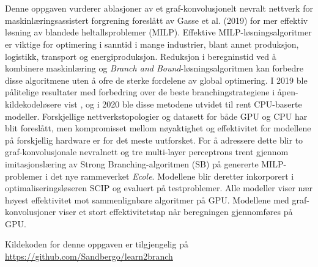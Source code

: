 \chapter*{\norwegianabstractname}
%
Denne oppgaven vurderer ablasjoner av et graf-konvolusjonelt nevralt nettverk for maskinlæringsassistert forgrening foreslått av Gasse et al. (2019) for mer effektiv løsning av blandede heltallsproblemer (\gls{MILP}).
Effektive \gls{MILP}-løsningsalgoritmer er viktige for optimering i sanntid i mange industrier, blant annet produksjon, logistikk, transport og energiproduksjon. 
Reduksjon i beregninstid ved å kombinere maskinlæring og \textit{Branch and Bound}-løsningsalgoritmen kan forbedre disse algoritmene uten å ofre de sterke fordelene av global optimering.  
I 2019 ble pålitelige resultater med forbedring over de beste branchingstrategiene i åpen-kildekodeløsere vist , og i 2020 ble disse metodene utvidet til rent \gls{CPU}-baserte modeller.
Forskjellige nettverkstopologier og datasett for både \gls{GPU} og \gls{CPU} har blit foreslått, men kompromisset mellom nøyaktighet og effektivitet for modellene på forskjellig hardware er for det meste uutforsket. 
For å adressere dette blir to graf-konvolusjonale nevralnett og tre multi-layer perceptrons trent gjennom imitasjonslæring av Strong Branching-algoritmen (\gls{SB}) på genererte \gls{MILP}-problemer i det nye rammeverket \textit{\gls{Ecole}}. Modellene blir deretter inkorporert i optimaliseringsløseren \gls{SCIP} og evaluert på testproblemer. Alle modeller viser nær høyest effektivitet mot sammenlignbare algoritmer på \gls{GPU}. Modellene med graf-konvolusjoner viser et stort effektivitetstap når beregningen gjennomføres på \gls{GPU}.

Kildekoden for denne oppgaven er tilgjengelig på\\ \url{https://github.com/Sandbergo/learn2branch}
\clearpage

